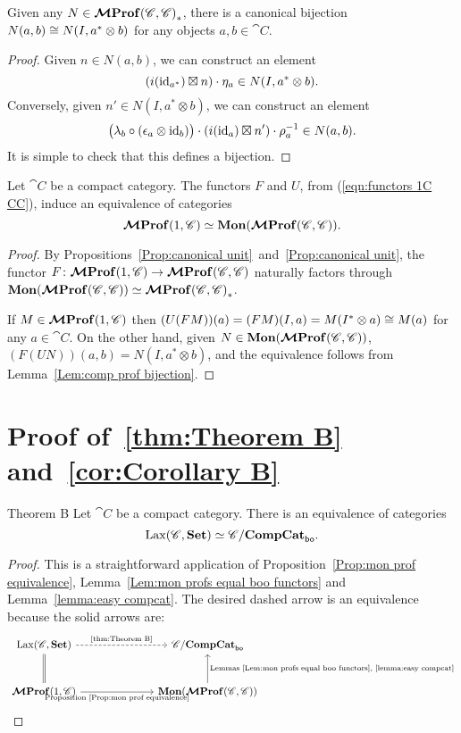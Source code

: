 \documentclass[12pt,oneside,article,draft]{memoir}
\begin{document}
\begin{lemma}\label{Lem:comp prof bijection}
	Given any $N\in\bm{\mathcal{M}}\mathbf{Prof}{(\mathscr{C},\mathscr{C})}_*$, there is a canonical bijection $N(a,b)\cong N(I,a^*\otimes b)$ for any objects $a,b\in\cat{C}$.
\end{lemma}
\begin{proof}
	Given $n\in N(a,b)$, we can construct an element
	\[
		(i(\operatorname{id}_{a^*})\boxtimes n)\cdot\eta_a \in N(I,a^*\otimes b).
	\]
	Conversely, given $n'\in N(I,a^*\otimes b)$, we can construct an element
	\[
		\bigl(\lambda_b\circ(\epsilon_a\otimes\operatorname{id}_b)\bigr)\cdot(i(\operatorname{id}_a)\boxtimes n')\cdot\rho_a^{-1} \in N(a,b).
	\]
	It is simple to check that this defines a bijection.
\end{proof}

\begin{proposition}\label{Prop:mon prof equivalence}
	Let $\cat{C}$ be a compact category.
	The functors $F$ and $U$, from (\ref{eqn:functors 1C CC}), induce an equivalence of categories
	\[
		\bm{\mathcal{M}}\mathbf{Prof}(1,\mathscr{C})\simeq\mathbf{Mon}(\bm{\mathcal{M}}\mathbf{Prof}(\mathscr{C},\mathscr{C})).
	\]
\end{proposition}
\begin{proof}
	By Propositions~\ref{Prop:canonical unit}~and~\ref{Prop:canonical unit}, the functor $F\colon\bm{\mathcal{M}}\mathbf{Prof}(1,\mathscr{C}) \to \bm{\mathcal{M}}\mathbf{Prof}(\mathscr{C},\mathscr{C})$ naturally factors through $\mathbf{Mon}(\bm{\mathcal{M}}\mathbf{Prof}(\mathscr{C},\mathscr{C}))\simeq\bm{\mathcal{M}}\mathbf{Prof}{(\mathscr{C},\mathscr{C})}_*$.

	If $M\in\bm{\mathcal{M}}\mathbf{Prof}(1,\mathscr{C})$ then $(U(FM))(a)=(FM)(I,a)=M(I^*\otimes a)\cong M(a)$ for any $a\in\cat{C}$.
	On the other hand, given $N\in\mathbf{Mon}(\bm{\mathcal{M}}\mathbf{Prof}(\mathscr{C},\mathscr{C}))$, $(F(UN))(a,b)=N(I,a^*\otimes b)$, and the equivalence follows from Lemma~\ref{Lem:comp prof bijection}.
\end{proof}

\section{Proof of~\ref{thm:Theorem B} and~\ref{cor:Corollary B}}\label{sec:proof of Bs}

\begin{named}{Theorem B}\label{thm:Theorem B}
	Let $\cat{C}$ be a compact category.
	There is an equivalence of categories
	\[
		\operatorname{Lax}(\mathscr{C},\mathbf{Set})\simeq\mathscr{C}/\mathbf{CompCat}_{\mathsf{bo}}.
	\]
\end{named}
\begin{proof}
	This is a straightforward application of Proposition~\ref{Prop:mon prof equivalence}, Lemma~\ref{Lem:mon profs equal boo functors} and Lemma~\ref{lemma:easy compcat}.
	The desired dashed arrow is an equivalence because the solid arrows are:
	$$
	\begin{tikzcd}[column sep=2.5cm,row sep=1cm]
		\Lax(\cat{C},\Set)\ar[d,equal]\ar[r,dashed,"\tn{\ref{thm:Theorem B}}"]
			&\cat{C}/\CompCat_{\bo} \\
		\MProf(1,\cat{C})\ar[r,"\tn{Proposition~\ref{Prop:mon prof equivalence}}"']
			&\Mon(\MProf(\cat{C},\cat{C}))\ar[u,"\tn{Lemmas~\ref{Lem:mon profs equal boo functors},~\ref{lemma:easy compcat}}"']
	\end{tikzcd}
	$$
\end{proof}
\end{document}
